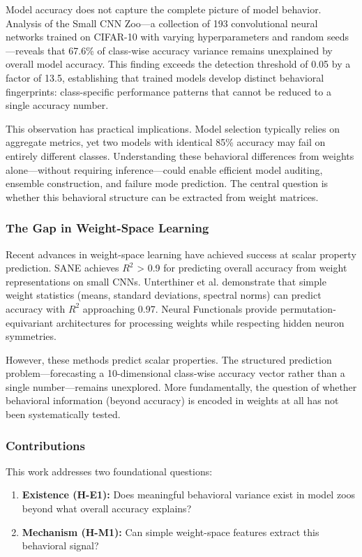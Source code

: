
Model accuracy does not capture the complete picture of model behavior. Analysis of the Small CNN Zoo---a collection of 193 convolutional neural networks trained on CIFAR-10 with varying hyperparameters and random seeds---reveals that 67.6\% of class-wise accuracy variance remains unexplained by overall model accuracy. This finding exceeds the detection threshold of 0.05 by a factor of 13.5, establishing that trained models develop distinct behavioral fingerprints: class-specific performance patterns that cannot be reduced to a single accuracy number.

This observation has practical implications. Model selection typically relies on aggregate metrics, yet two models with identical 85\% accuracy may fail on entirely different classes. Understanding these behavioral differences from weights alone---without requiring inference---could enable efficient model auditing, ensemble construction, and failure mode prediction. The central question is whether this behavioral structure can be extracted from weight matrices.

\subsubsection{The Gap in Weight-Space Learning}

Recent advances in weight-space learning have achieved success at scalar property prediction. SANE achieves $R^2$ > 0.9 for predicting overall accuracy from weight representations on small CNNs. Unterthiner et al. demonstrate that simple weight statistics (means, standard deviations, spectral norms) can predict accuracy with $R^2$ approaching 0.97. Neural Functionals provide permutation-equivariant architectures for processing weights while respecting hidden neuron symmetries.

However, these methods predict scalar properties. The structured prediction problem---forecasting a 10-dimensional class-wise accuracy vector rather than a single number---remains unexplored. More fundamentally, the question of whether behavioral information (beyond accuracy) is encoded in weights at all has not been systematically tested.

\subsubsection{Contributions}

This work addresses two foundational questions:

\begin{enumerate}
\item \textbf{Existence (H-E1):} Does meaningful behavioral variance exist in model zoos beyond what overall accuracy explains?
\item \textbf{Mechanism (H-M1):} Can simple weight-space features extract this behavioral signal?
\end{enumerate}

